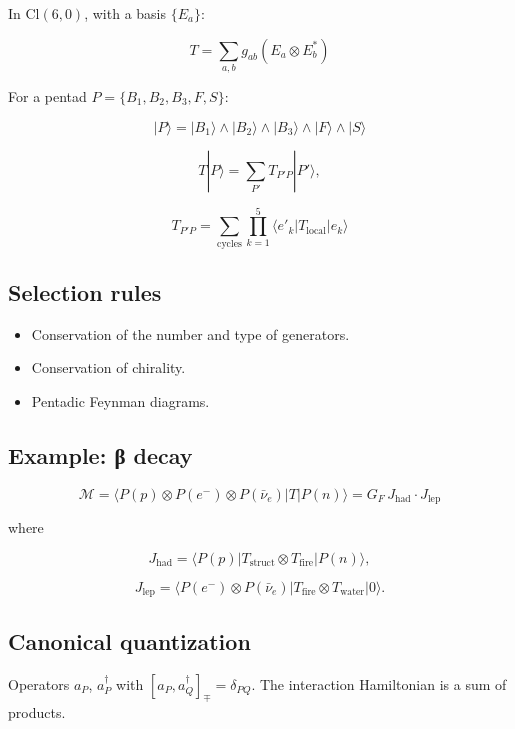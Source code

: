 \documentclass[11pt]{article}
\providecommand{\tightlist}{%
\setlength{\itemsep}{2pt}\setlength{\parskip}{6pt}
}
\begin{document}
In \(\text{Cl}(6,0)\), with a basis \(\{E_a\}\):

\[
T = \sum_{a,b} g_{ab} (E_a \otimes E_b^*)
\]

For a pentad \(P = \{B_1,B_2,B_3,F,S\}\):

\[
|P\rangle = |B_1\rangle \wedge |B_2\rangle \wedge |B_3\rangle \wedge |F\rangle \wedge |S\rangle
\]

\[
T|P\rangle = \sum_{P'} T_{P'P} |P'\rangle,
\]

\[
T_{P'P} = \sum_{\text{cycles}} \prod_{k=1}^5 \langle e'_k | T_{\text{local}} | e_k \rangle
\]

\hypertarget{selection-rules}{%
\subsection{Selection rules}\label{selection-rules}}

\begin{itemize}
\tightlist
\item
  Conservation of the number and type of generators.
\item
  Conservation of chirality.
\item
  Pentadic Feynman diagrams.
\end{itemize}

\hypertarget{example-ux3b2-decay}{%
\subsection{Example: β decay}\label{example-ux3b2-decay}}

\[
\mathcal{M} = \langle P(p) \otimes P(e^-) \otimes P(\bar{\nu}_e) | T | P(n) \rangle = G_F \, J_{\text{had}} \cdot J_{\text{lep}}
\]

where

\[
J_{\text{had}} = \langle P(p) | T_{\text{struct}} \otimes T_{\text{fire}} | P(n) \rangle,
\]

\[
J_{\text{lep}} = \langle P(e^-) \otimes P(\bar{\nu}_e) | T_{\text{fire}} \otimes T_{\text{water}} |0\rangle.
\]

\hypertarget{canonical-quantization}{%
\subsection{Canonical quantization}\label{canonical-quantization}}

Operators \(a_P\), \(a_P^\dagger\) with
\([a_P, a_Q^\dagger]_{\mp} = \delta_{PQ}\). The interaction Hamiltonian
is a sum of products.
\end{document}
